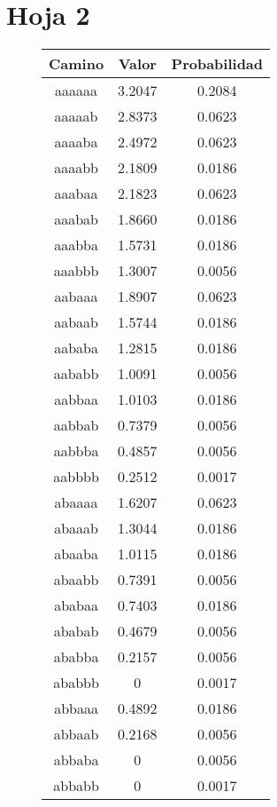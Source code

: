 \section{Hoja 2}

\begin{figure}[hbpt]
\begin{minipage}{0.48\textwidth}
\begin{center}
\begin{tabular}{|c|c|c|}
\hline
\textbf{Camino} & \textbf{Valor} & \textbf{Probabilidad} \\
\hline
aaaaaa  &  3.2047  &  0.2084  \\
aaaaab  &  2.8373  &  0.0623  \\
aaaaba  &  2.4972  &  0.0623  \\
aaaabb  &  2.1809  &  0.0186  \\
aaabaa  &  2.1823  &  0.0623  \\
aaabab  &  1.8660  &  0.0186  \\
aaabba  &  1.5731  &  0.0186  \\
aaabbb  &  1.3007  &  0.0056  \\
aabaaa  &  1.8907  &  0.0623  \\
aabaab  &  1.5744  &  0.0186  \\
aababa  &  1.2815  &  0.0186  \\
aababb  &  1.0091  &  0.0056  \\
aabbaa  &  1.0103  &  0.0186  \\
aabbab  &  0.7379  &  0.0056  \\
aabbba  &  0.4857  &  0.0056  \\
aabbbb  &  0.2512  &  0.0017  \\
abaaaa  &  1.6207  &  0.0623  \\
abaaab  &  1.3044  &  0.0186  \\
abaaba  &  1.0115  &  0.0186  \\
abaabb  &  0.7391  &  0.0056  \\
ababaa  &  0.7403  &  0.0186  \\
ababab  &  0.4679  &  0.0056  \\
ababba  &  0.2157  &  0.0056  \\
ababbb  & 0 &  0.0017  \\
abbaaa  &  0.4892  &  0.0186  \\
abbaab  &  0.2168  &  0.0056  \\
abbaba  & 0 &  0.0056  \\
abbabb  & 0 &  0.0017  \\

\end{tabular}
\end{center}
\end{minipage}
\end{figure}
